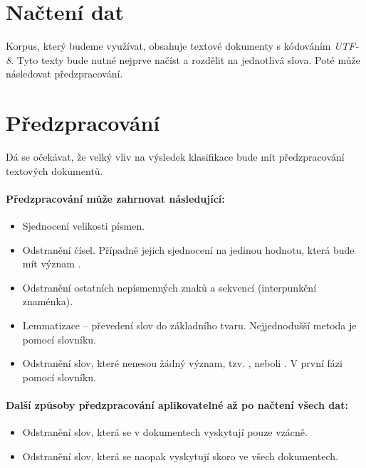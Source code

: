 \documentclass[12pt, a4paper]{report}
\begin{document}
\section{Načtení dat}
Korpus, který budeme využívat, obsahuje textové dokumenty s kódováním \mbox{\emph{UTF-8}}. Tyto texty bude nutné nejprve načíst a rozdělit na jednotlivá slova. Poté může následovat předzpracování.

\section{Předzpracování}
\label{sec:preprocessing}
Dá se očekávat, že velký vliv na výsledek klasifikace bude mít předzpracování textových dokumentů. 

\paragraph{Předzpracování může zahrnovat následující:}
\begin{itemize}
	\item Sjednocení velikosti písmen.
	\item Odstranění čísel. Případně jejich sjednocení na jedinou hodnotu, která bude mít význam .
	\item Odstranění ostatních nepísmenných znaků a sekvencí (interpunkční znaménka).
	\item Lemmatizace -- převedení slov do základního tvaru. Nejjednodušší metoda je pomocí slovníku.
	\item Odstranění slov, které nenesou žádný význam, tzv. , neboli . V první fázi pomocí slovníku.
\end{itemize}

\paragraph{Další způsoby předzpracování aplikovatelné až po načtení všech dat:}
\begin{itemize}
	\item Odstranění slov, která se v dokumentech vyskytují pouze vzácně.
	\item Odstranění slov, která se naopak vyskytují skoro ve všech dokumentech.
\end{itemize}
\end{document}
